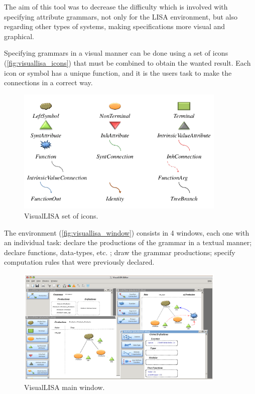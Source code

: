 The aim of this tool was to decrease the difficulty which is involved with specifying attribute grammars, not only for the LISA environment, but also regarding other types of systems, making specifications more visual and graphical.
    
Specifying grammars in a visual manner can be done using a set of icons (\autoref{fig:visuallisa_icons}) that must be combined to obtain the wanted result. Each icon or symbol has a unique function, and it is the users task to make the connections in a correct way.
    
\begin{figure}[h]
    \centering
    \includegraphics[width=10cm]{images/visuallisa_icons.png}
    \caption{VisualLISA set of icons.}
    \label{fig:visuallisa_icons}
\end{figure}
    
The environment (\autoref{fig:visuallisa_window}) consists in 4 windows, each one with an individual task: declare the productions of the grammar in a textual manner; declare functions, data-types, etc. ; draw the grammar productions; specify computation rules that were previously declared.
    
\begin{figure}[h]
    \centering
    \includegraphics[width=10cm]{images/visuallisa_window.png}
    \caption{VisualLISA main window.}
    \label{fig:visuallisa_window}
\end{figure}
    
